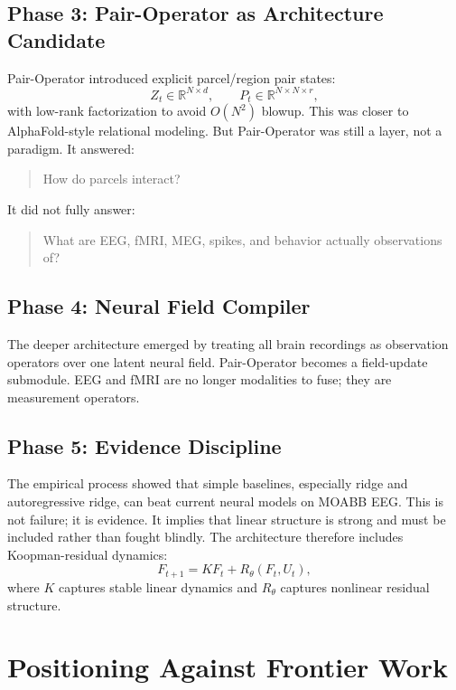 \documentclass[11pt]{article}
\newcommand{\R}{\mathbb{R}}
\begin{document}
\subsection{Phase 3: Pair-Operator as Architecture Candidate}

Pair-Operator introduced explicit parcel/region pair states:
\begin{equation}
Z_t \in \R^{N\times d}, \qquad P_t \in \R^{N\times N\times r},
\end{equation}
with low-rank factorization to avoid $O(N^2)$ blowup. This was closer to AlphaFold-style relational modeling. But Pair-Operator was still a layer, not a paradigm. It answered:
\begin{quote}
How do parcels interact?
\end{quote}
It did not fully answer:
\begin{quote}
What are EEG, fMRI, MEG, spikes, and behavior actually observations of?
\end{quote}

\subsection{Phase 4: Neural Field Compiler}

The deeper architecture emerged by treating all brain recordings as observation operators over one latent neural field. Pair-Operator becomes a field-update submodule. EEG and fMRI are no longer modalities to fuse; they are measurement operators.

\subsection{Phase 5: Evidence Discipline}

The empirical process showed that simple baselines, especially ridge and autoregressive ridge, can beat current neural models on MOABB EEG. This is not failure; it is evidence. It implies that linear structure is strong and must be included rather than fought blindly. The architecture therefore includes Koopman-residual dynamics:
\begin{equation}
F_{t+1} = KF_t + R_\theta(F_t,U_t),
\end{equation}
where $K$ captures stable linear dynamics and $R_\theta$ captures nonlinear residual structure.

\section{Positioning Against Frontier Work}
\end{document}
